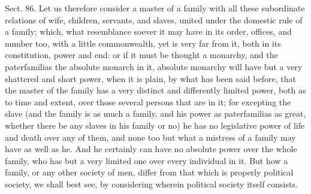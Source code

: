 \documentclass[11pt,openany]{book}
\begin{document}
Sect. 86. Let us therefore consider a master of a family with all these subordinate relations of wife, children, servants, and slaves, united under the domestic rule of a family; which, what resemblance soever it may have in its order, offices, and number too, with a little commonwealth, yet is very far from it, both in its constitution, power and end: or if it must be thought a monarchy, and the paterfamilias the absolute monarch in it, absolute monarchy will have but a very shattered and short power, when it is plain, by what has been said before, that the master of the family has a very distinct and differently limited power, both as to time and extent, over those several persons that are in it; for excepting the slave (and the family is as much a family, and his power as paterfamilias as great, whether there be any slaves in his family or no) he has no legislative power of life and death over any of them, and none too but what a mistress of a family may have as well as he. And he certainly can have no absolute power over the whole family, who has but a very limited one over every individual in it. But how a family, or any other society of men, differ from that which is properly political society, we shall best see, by considering wherein political society itself consists.
\end{document}

